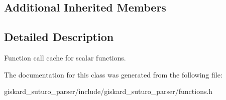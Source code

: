 \subsection*{Additional Inherited Members}


\subsection{Detailed Description}
Function call cache for scalar functions. 

The documentation for this class was generated from the following file\-:\begin{DoxyCompactItemize}
\item 
giskard\-\_\-suturo\-\_\-parser/include/giskard\-\_\-suturo\-\_\-parser/functions.\-h\end{DoxyCompactItemize}
